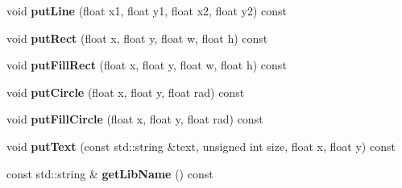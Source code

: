 \begin{DoxyCompactItemize}
void {\bfseries put\+Line} (float x1, float y1, float x2, float y2) const
\item 
\mbox{\label{class_sfml_module_ae7de260c9a294edc33bb5c0b9c5ec4b8}} 
void {\bfseries put\+Rect} (float x, float y, float w, float h) const
\item 
\mbox{\label{class_sfml_module_aac56c5eb2b4324cd210c733f6ccb936e}} 
void {\bfseries put\+Fill\+Rect} (float x, float y, float w, float h) const
\item 
\mbox{\label{class_sfml_module_ac6f04622d1459e3394a14a271c71867d}} 
void {\bfseries put\+Circle} (float x, float y, float rad) const
\item 
\mbox{\label{class_sfml_module_a9cc2ff7b3e18ef1fcfd57286979cce91}} 
void {\bfseries put\+Fill\+Circle} (float x, float y, float rad) const
\item 
\mbox{\label{class_sfml_module_aa7b6641912d669cd28ed1468b8fb0fa2}} 
void {\bfseries put\+Text} (const std\+::string \&text, unsigned int size, float x, float y) const
\item 
\mbox{\label{class_sfml_module_a1acf0e6594cb2498994120f50df2cbd2}} 
const std\+::string \& {\bfseries get\+Lib\+Name} () const
\end{DoxyCompactItemize}
